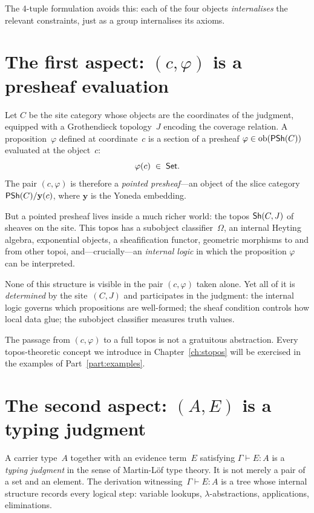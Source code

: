 The 4-tuple formulation avoids this: each of the four objects
\emph{internalises} the relevant constraints, just as a group
internalises its axioms.

\section{The first aspect: $(c,\varphi)$ is a presheaf evaluation}
\label{sec:obs-topos}

Let $C$ be the site category whose objects are the coordinates of the
judgment, equipped with a Grothendieck topology~$J$ encoding the
coverage relation.  A proposition~$\varphi$ defined at coordinate~$c$
is a section of a presheaf $\varphi \in \mathrm{ob}(\mathsf{PSh}(C))$ evaluated at the
object~$c$:
\[
  \varphi(c) \;\in\; \mathsf{Set}.
\]
The pair $(c,\varphi)$ is therefore a \emph{pointed presheaf}---an
object of the slice category $\mathsf{PSh}(C)/\mathbf{y}(c)$, where
$\mathbf{y}$ is the Yoneda embedding.

But a pointed presheaf lives inside a much richer world: the topos
$\mathsf{Sh}(C,J)$ of sheaves on the site.  This topos has a subobject
classifier~$\Omega$, an internal Heyting algebra, exponential objects,
a sheafification functor, geometric morphisms to and from other topoi,
and---crucially---an \emph{internal logic} in which the proposition
$\varphi$ can be interpreted.

None of this structure is visible in the pair $(c,\varphi)$ taken
alone.  Yet all of it is \emph{determined} by the site~$(C,J)$ and
participates in the judgment: the internal logic governs which
propositions are well-formed; the sheaf condition controls how local
data glue; the subobject classifier measures truth values.

\begin{remark}
The passage from $(c,\varphi)$ to a full topos is not a gratuitous
abstraction.  Every topos-theoretic concept we introduce in
Chapter~\ref{ch:stopos} will be exercised in the examples of
Part~\ref{part:examples}.
\end{remark}

\section{The second aspect: $(A,E)$ is a typing judgment}
\label{sec:obs-type}

A carrier type~$A$ together with an evidence term~$E$ satisfying
$\Gamma \vdash E : A$ is a \emph{typing judgment} in the sense of
Martin-L\"of type theory.  It is not merely a pair of a set and an
element.  The derivation witnessing~$\Gamma \vdash E : A$ is a tree
whose internal structure records every logical step: variable lookups,
$\lambda$-abstractions, applications, eliminations.

